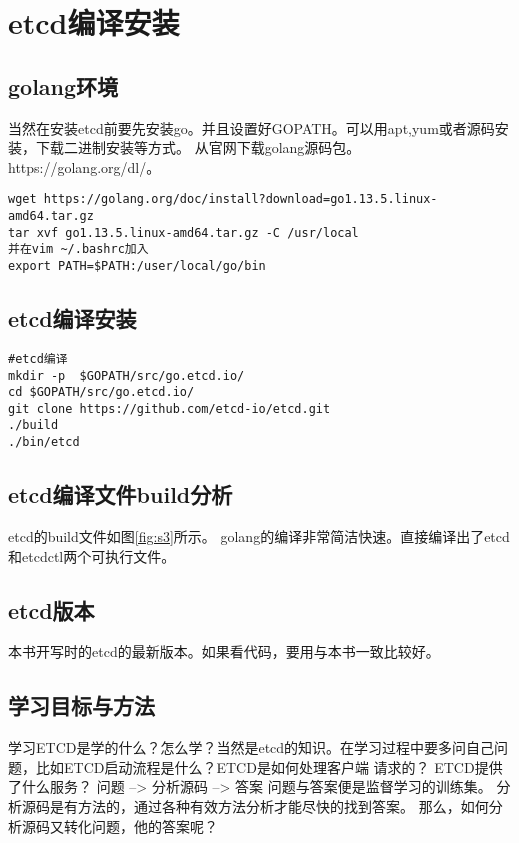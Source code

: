 
\mylineskip
\chapter{etcd编译安装}\label{chaper:ch1}
\section{golang环境}
当然在安装etcd前要先安装go。并且设置好GOPATH。可以用apt,yum或者源码安装，下载二进制安装等方式。
从官网下载golang源码包。https://golang.org/dl/。

\begin{verbatim}
wget https://golang.org/doc/install?download=go1.13.5.linux-amd64.tar.gz
tar xvf go1.13.5.linux-amd64.tar.gz -C /usr/local
并在vim ~/.bashrc加入
export PATH=$PATH:/user/local/go/bin
\end{verbatim}


\section{etcd编译安装}
\begin{verbatim}
#etcd编译
mkdir -p  $GOPATH/src/go.etcd.io/
cd $GOPATH/src/go.etcd.io/
git clone https://github.com/etcd-io/etcd.git
./build
./bin/etcd
\end{verbatim}


\section{etcd编译文件build分析}
	etcd的build文件如图\ref{fig:s3}所示。 golang的编译非常简洁快速。直接编译出了etcd和etcdctl两个可执行文件。


\section{etcd版本}
	本书开写时的etcd的最新版本。如果看代码，要用与本书一致比较好。

\section{学习目标与方法}
学习ETCD是学的什么？怎么学？当然是etcd的知识。在学习过程中要多问自己问题，比如ETCD启动流程是什么？ETCD是如何处理客户端
请求的？ ETCD提供了什么服务？
问题 --> 分析源码 --> 答案
问题与答案便是监督学习的训练集。 分析源码是有方法的，通过各种有效方法分析才能尽快的找到答案。
那么，如何分析源码又转化问题，他的答案呢？

